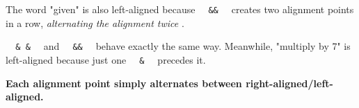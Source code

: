\pandocbounded{}

The word "given" is also left-aligned because
\texttt{\ }{\texttt{\ \&\&\ }}\texttt{\ } creates two alignment points
in a row, \emph{alternating the alignment twice} .

\texttt{\ }{\texttt{\ \&\ \&\ }}\texttt{\ } and
\texttt{\ }{\texttt{\ \&\&\ }}\texttt{\ } behave exactly the same way.
Meanwhile, "multiply by 7" is left-aligned because just one
\texttt{\ }{\texttt{\ \&\ }}\texttt{\ } precedes it.

\textbf{Each alignment point simply alternates between
right-aligned/left-aligned.}
